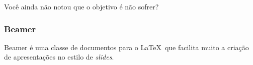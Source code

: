 \documentclass[aspect=43,14pt]{beamer}
\begin{document}
\begin{frame}
\end{frame}

\begin{frame}
    \Huge Você ainda não notou que o objetivo é não sofrer?
\end{frame}

\begin{frame}
    \frametitle{Beamer}
    Beamer é uma classe de documentos para o \LaTeX\ que facilita muito
    a criação de apresentações no estilo de \emph{slides}.
\end{frame}
\end{document}
